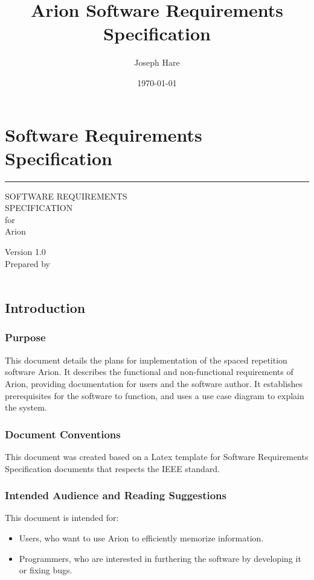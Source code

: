 \documentclass{scrreprt}
\title{Arion Software Requirements Specification}
\author{Joseph Hare}
\date{\today}
\makeatletter
\newcommand{\theauthor}{\@author}
\newcommand{\thedate}{\@date}
\newcommand{\version}{1.0 }
\newcommand{\bigspace}{\vspace{1.9cm}}
\newcommand{\smallspace}{\vspace{0.5cm}}
\makeatother
\begin{document}
\part*{Software Requirements Specification}

\begin{flushright}
    \rule{\linewidth}{5pt}
    \vskip 1cm
    \begin{bfseries}
        \Huge
        SOFTWARE REQUIREMENTS\\
        SPECIFICATION\\
        \smallspace
        for\\
        \smallspace
        Arion\\
        \bigspace

        \LARGE
        Version \version \\
        \smallspace
        Prepared by \theauthor\\
        \smallspace
        \thedate\\
    \end{bfseries}
\end{flushright}

\tableofcontents
\newpage


\chapter{Introduction}

\section{Purpose}
This document details the plans for implementation of the spaced repetition software Arion.
It describes the functional and non-functional requirements of Arion, providing documentation for users
and the software author.
It establishes prerequisites for the software to function, and uses a use case diagram to explain the system.

\section{Document Conventions}
This document was created based on a Latex template for Software Requirements Specification documents that
respects the IEEE standard.

\section{Intended Audience and Reading Suggestions}
This document is intended for:
\begin{itemize}
    \item Users, who want to use Arion to efficiently memorize information.
    \item Programmers, who are interested in furthering the software by developing it or
fixing bugs. 
\end{itemize}
\end{document}
